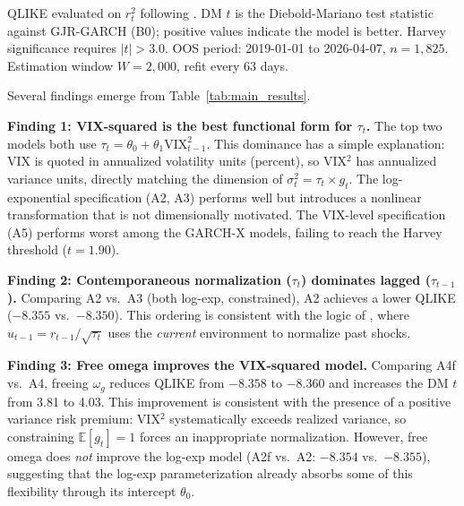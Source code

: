 \documentclass[12pt,a4paper]{article}
\newcommand{\E}{\mathbb{E}}
\begin{document}
\begin{table}[H]
\begin{threeparttable}
\begin{tabular}{@{}rlcccl@{}}
\bottomrule
\end{tabular}
\begin{tablenotes}
\footnotesize
\item QLIKE evaluated on $r_t^2$ following \citet{patton2011}. DM $t$ is the Diebold-Mariano test statistic against GJR-GARCH (B0); positive values indicate the model is better. Harvey significance requires $|t| > 3.0$. OOS period: 2019-01-01 to 2026-04-07, $n = 1{,}825$. Estimation window $W = 2{,}000$, refit every 63 days.
\end{tablenotes}
\end{threeparttable}
\end{table}

Several findings emerge from Table~\ref{tab:main_results}.

\textbf{Finding 1: VIX-squared is the best functional form for $\tau_t$.} The top two models both use $\tau_t = \theta_0 + \theta_1 \mathrm{VIX}_{t-1}^2$. This dominance has a simple explanation: VIX is quoted in annualized volatility units (percent), so VIX$^2$ has annualized variance units, directly matching the dimension of $\sigma_t^2 = \tau_t \times g_t$. The log-exponential specification (A2, A3) performs well but introduces a nonlinear transformation that is not dimensionally motivated. The VIX-level specification (A5) performs worst among the GARCH-X models, failing to reach the Harvey threshold ($t = 1.90$).

\textbf{Finding 2: Contemporaneous normalization ($\tau_t$) dominates lagged ($\tau_{t-1}$).} Comparing A2 vs.\ A3 (both log-exp, constrained), A2 achieves a lower QLIKE ($-8.355$ vs.\ $-8.350$). This ordering is consistent with the logic of \citet[Eq.~4]{engle2013}, where $u_{t-1} = r_{t-1}/\sqrt{\tau_t}$ uses the \emph{current} environment to normalize past shocks.

\textbf{Finding 3: Free omega improves the VIX-squared model.} Comparing A4f vs.\ A4, freeing $\omega_g$ reduces QLIKE from $-8.358$ to $-8.360$ and increases the DM $t$ from 3.81 to 4.03. This improvement is consistent with the presence of a positive variance risk premium: VIX$^2$ systematically exceeds realized variance, so constraining $\E[g_t] = 1$ forces an inappropriate normalization. However, free omega does \emph{not} improve the log-exp model (A2f vs.\ A2: $-8.354$ vs.\ $-8.355$), suggesting that the log-exp parameterization already absorbs some of this flexibility through its intercept $\theta_0$.
\end{document}
